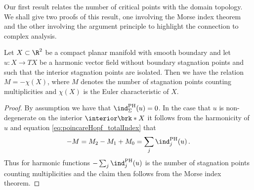 Our first result relates the number of critical points with the domain topology.
We shall give two proofs of this result, one involving the Morse index theorem and the other involving
the argument principle to highlight the connection to complex analysis.
\begin{proposition}\label{pr:n2_hvf_noInflowNoOutflow}
  Let $X\subset\R^2$ be a compact planar manifold with smooth boundary
  and let $u\colon X\to TX$ be
  a harmonic vector field without boundary stagnation points and such that the interior stagnation points are isolated.
  Then we have the relation $M=-\chi(X)$, where $M$ denotes the number of stagnation points counting multiplicities and
  $\chi(X)$ is the Euler characteristic of $X$.
\end{proposition}
\begin{proof}
  By assumption we have that $\ind^\text{PH}_\Sigma(u)=0$. In the case that $u$ is non-degenerate on the interior $\interior\brk*{X}$
  it follows from the harmonicity of $u$ and equation \eqref{eq:poincareHopf_totalIndex} that
  \begin{align*}
    -M=M_2-M_1+M_0=\sum_j\ind^\text{PH}_j(u)\,.
  \end{align*}
  Thus for harmonic functions $-\sum_j\ind^\text{PH}_j(u)$ is the number of stagnation points counting multiplicities and the
  claim then follows from the Morse index theorem.
\end{proof}
